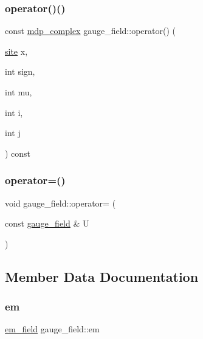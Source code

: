 \subsubsection{\texorpdfstring{operator()()}{operator()()}\hspace{0.1cm}{\footnotesize\ttfamily [7/7]}}
{\footnotesize\ttfamily const \hyperlink{classmdp__complex}{mdp\+\_\+complex} gauge\+\_\+field\+::operator() (\begin{DoxyParamCaption}\item[{\hyperlink{mdp__compatibility__macros_8h_aa6f1179c424e48adef1cedf7c436eb75}{site}}]{x,  }\item[{int}]{sign,  }\item[{int}]{mu,  }\item[{int}]{i,  }\item[{int}]{j }\end{DoxyParamCaption}) const\hspace{0.3cm}{\ttfamily [inline]}}

\mbox{\label{classgauge__field_a1006054965a512e4dd06ca8c0b5c5d28}} 
\subsubsection{\texorpdfstring{operator=()}{operator=()}}
{\footnotesize\ttfamily void gauge\+\_\+field\+::operator= (\begin{DoxyParamCaption}\item[{const \hyperlink{classgauge__field}{gauge\+\_\+field} \&}]{U }\end{DoxyParamCaption})\hspace{0.3cm}{\ttfamily [inline]}}



\subsection{Member Data Documentation}
\mbox{\label{classgauge__field_a8e12cc66b84dc51a33e0a942cc7c3f5c}} 
\subsubsection{\texorpdfstring{em}{em}}
{\footnotesize\ttfamily \hyperlink{classem__field}{em\+\_\+field} gauge\+\_\+field\+::em}

